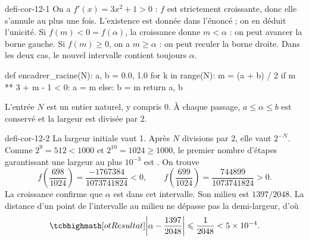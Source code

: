 \begin{blocEdition}{defi-cor-12-1}
On a $f'(x)=3x^2+1>0$ : $f$ est strictement croissante, donc elle s'annule au plus une fois.
L'existence est donnée dans l'énoncé ; on en déduit l'unicité.
Si $f(m)<0=f(\alpha)$, la croissance donne $m<\alpha$ : on peut avancer la borne gauche.
Si $f(m)\geq0$, on a $m\geq\alpha$ : on peut reculer la borne droite.
Dans les deux cas, le nouvel intervalle contient toujours $\alpha$.
\begin{python}
def encadrer_racine(N):
    a, b = 0.0, 1.0
    for k in range(N):
        m = (a + b) / 2
        if m ** 3 + m - 1 < 0:
            a = m
        else:
            b = m
    return a, b
\end{python}
L'entrée $N$ est un entier naturel, y compris 0. À chaque passage,
$a\leq\alpha\leq b$ est conservé et la largeur est divisée par 2.
\end{blocEdition}

\begin{blocEdition}{defi-cor-12-2}
La largeur initiale vaut 1. Après $N$ divisions par 2, elle vaut $2^{-N}$.
Comme $2^9=512<1000$ et $2^{10}=1024\geq1000$, le premier nombre d'étapes
garantissant une largeur au plus $10^{-3}$ est .
On trouve
\[f\left(\frac{698}{1024}\right)=\frac{-1767384}{1073741824}<0,
\qquad f\left(\frac{699}{1024}\right)=\frac{744899}{1073741824}>0.\]
La croissance confirme que $\alpha$ est dans cet intervalle.
Son milieu est $1397/2048$. La distance d'un point de l'intervalle au milieu
ne dépasse pas la demi-largeur, d'où
\[\res{\left|\alpha-\frac{1397}{2048}\right|\leq\frac1{2048}<5\times10^{-4}}.\]
\label{figedition-defi-cor-12-2-1}
\end{blocEdition}

